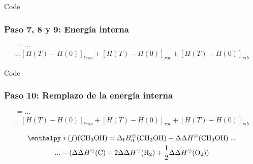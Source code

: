 \documentclass{beamer}
\begin{document}
\begin{frame}[fragile]{Code}
\frametitle{Paso 7, 8 y 9: Energía interna}

\begin{multline*}
[H(298.15)-H(0)] =... \\... [H(T)-H(0)]_{tras}+[H(T)-H(0)]_{rot}+[H(T)-H(0)]_{vib}
\end{multline*}


\end{frame}
\begin{frame}[fragile]{Code}
\frametitle{Paso 10: Remplazo de la energía interna}

\begin{multline*}
[H(298.15)-H(0)] =... \\... [H(T)-H(0)]_{tras}+[H(T)-H(0)]_{rot}+[H(T)-H(0)]_{vib}
\end{multline*}

\begin{multline*}
	\enthalpy*(f){}\mathrm{(CH_3OH)} = \mathrm{\Delta}_\mathrm{{f}} H^{\circleddash}_{0}\mathrm{(CH_{3}OH)} + \mathrm{\Delta \Delta} H^{\circleddash} \mathrm{(CH_{3}OH)}\;...\\ ...- (\mathrm{\Delta \Delta} H^{\circleddash} \mathrm{(C)} + 2 \mathrm{\Delta \Delta} H^{\circleddash}\mathrm{(H_{2})} + \mathrm{\frac{1}{2}} \mathrm{\Delta \Delta} H^{\circleddash}\mathrm{(O_{2}))}
\end{multline*}



\end{frame}
\end{document}
